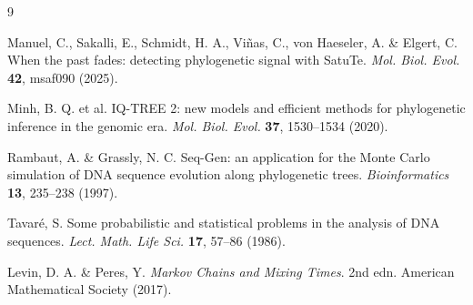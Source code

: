 \documentclass[11pt]{article}
\begin{document}
\begin{thebibliography}{9}

Manuel, C., Sakalli, E., Schmidt, H. A., Viñas, C., von Haeseler, A. \& Elgert, C. When the past fades: detecting phylogenetic signal with SatuTe. \emph{Mol. Biol. Evol.} \textbf{42}, msaf090 (2025).

Minh, B. Q. et al. IQ-TREE 2: new models and efficient methods for phylogenetic inference in the genomic era. \emph{Mol. Biol. Evol.} \textbf{37}, 1530--1534 (2020).

Rambaut, A. \& Grassly, N. C. Seq-Gen: an application for the Monte Carlo simulation of DNA sequence evolution along phylogenetic trees. \emph{Bioinformatics} \textbf{13}, 235--238 (1997).

Tavaré, S. Some probabilistic and statistical problems in the analysis of DNA sequences. \emph{Lect. Math. Life Sci.} \textbf{17}, 57--86 (1986).

Levin, D. A. \& Peres, Y. \emph{Markov Chains and Mixing Times}. 2nd edn. American Mathematical Society (2017).

\end{thebibliography}
\end{document}
